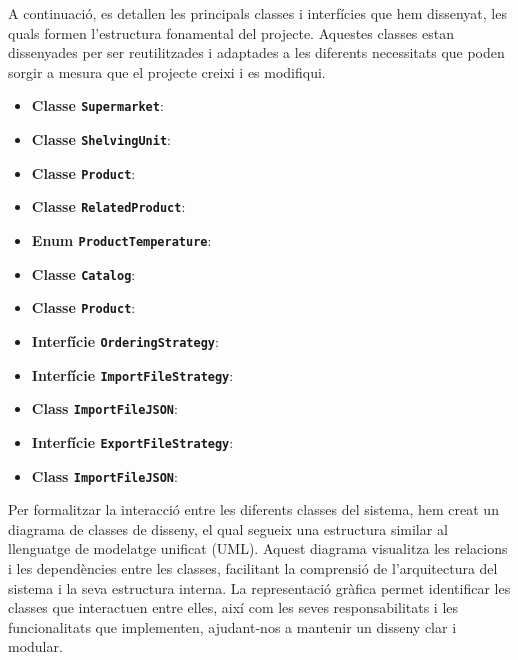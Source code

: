 \documentclass[a4paper,12pt]{report}
\begin{document}
A continuació, es detallen les principals classes i interfícies que hem dissenyat, les quals formen l'estructura fonamental del projecte. Aquestes classes estan dissenyades per ser reutilitzades i adaptades a les diferents necessitats que poden sorgir a mesura que el projecte creixi i es modifiqui.

\begin{itemize}
	\item \textbf{Classe \texttt{Supermarket}}:
	\item \textbf{Classe \texttt{ShelvingUnit}}:
	\item \textbf{Classe \texttt{Product}}:
	\item \textbf{Classe \texttt{RelatedProduct}}:
	\item \textbf{Enum \texttt{ProductTemperature}}:
	\item \textbf{Classe \texttt{Catalog}}:
	\item \textbf{Classe \texttt{Product}}:
	\item \textbf{Interfície \texttt{OrderingStrategy}}:
	\item \textbf{Interfície \texttt{ImportFileStrategy}}:
	\item \textbf{Class \texttt{ImportFileJSON}}:
	\item \textbf{Interfície \texttt{ExportFileStrategy}}:
	\item \textbf{Class \texttt{ImportFileJSON}}:
\end{itemize}

Per formalitzar la interacció entre les diferents classes del sistema, hem creat un diagrama de classes de disseny, el qual segueix una estructura similar al llenguatge de modelatge unificat (UML). Aquest diagrama visualitza les relacions i les dependències entre les classes, facilitant la comprensió de l'arquitectura del sistema i la seva estructura interna. La representació gràfica permet identificar les classes que interactuen entre elles, així com les seves responsabilitats i les funcionalitats que implementen, ajudant-nos a mantenir un disseny clar i modular.

	

\end{document}
